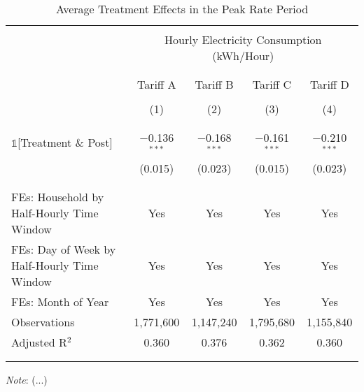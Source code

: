 \begin{table}[!htbp]
\caption{Average Treatment Effects in the Peak Rate Period}
\centering
\small
\begin{tabular}{@{\extracolsep{20pt}}lcccc} 
\\[-5.5ex]
\hline \hline
\\[-3.0ex] 
 & \multicolumn{4}{c}{Hourly Electricity Consumption  (kWh/Hour)} \\
\\[-3.0ex]  
\cline{2-5} 
\\[-3.0ex]
 & Tariff A & Tariff B & Tariff C & Tariff D \\ 
\\[-4.0ex]
 & (1) & (2) & (3) & (4) \\
\\[-3.0ex] 
\hline
\\[-2.0ex] 
$\mathbb{1}$[Treatment \& Post] & $-$0.136$^{***}$ & $-$0.168$^{***}$ & $-$0.161$^{***}$ & $-$0.210$^{***}$ \\ 
 & (0.015) & (0.023) & (0.015) & (0.023) \\ 
 & & & & \\ 
\hline
\\[-2.0ex] 
FEs: Household by Half-Hourly Time Window & Yes & Yes & Yes & Yes \\ 
FEs: Day of Week by Half-Hourly Time Window & Yes & Yes & Yes & Yes \\ 
FEs: Month of Year & Yes & Yes & Yes & Yes \\ 
Observations & 1,771,600 & 1,147,240 & 1,795,680 & 1,155,840 \\ 
Adjusted R$^{2}$ & 0.360 & 0.376 & 0.362 & 0.360 \\ 
\\[-2.0ex]
\hline \hline
\\[-4.5ex] 
\end{tabular}
\begin{tablenotes}
    \small
    \textit{Note}: (...) 
\end{tablenotes}
\label{Table:Average-Treatment-Effects-in-the-Peak-Rate-Period}
\end{table}
